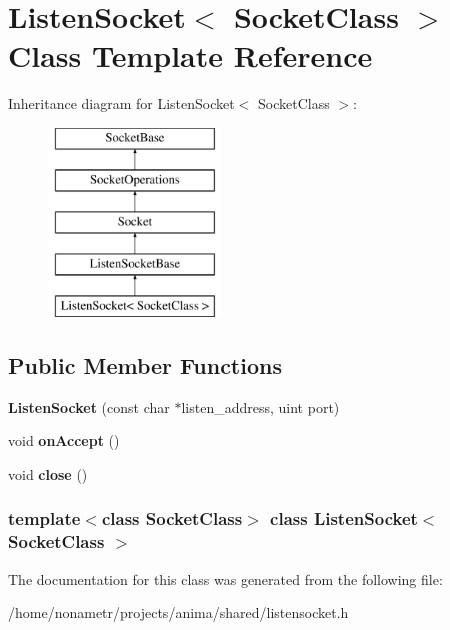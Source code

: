 \hypertarget{classListenSocket}{
\section{ListenSocket$<$ SocketClass $>$ Class Template Reference}
\label{classListenSocket}
}
Inheritance diagram for ListenSocket$<$ SocketClass $>$:\begin{figure}[H]
\begin{center}
\leavevmode
\includegraphics[height=5.000000cm]{classListenSocket}
\end{center}
\end{figure}
\subsection*{Public Member Functions}
\begin{DoxyCompactItemize}
\item 
\hypertarget{classListenSocket_a88bc05466de1c71e9981b1664a0631dd}{
{\bfseries ListenSocket} (const char $\ast$listen\_\-address, uint port)}
\label{classListenSocket_a88bc05466de1c71e9981b1664a0631dd}

\item 
\hypertarget{classListenSocket_ac62a573cd01cf0826e8d2a3872565e58}{
void {\bfseries onAccept} ()}
\label{classListenSocket_ac62a573cd01cf0826e8d2a3872565e58}

\item 
\hypertarget{classListenSocket_a611c169149189c64d3aa582806692350}{
void {\bfseries close} ()}
\label{classListenSocket_a611c169149189c64d3aa582806692350}

\end{DoxyCompactItemize}
\subsubsection*{template$<$class SocketClass$>$ class ListenSocket$<$ SocketClass $>$}



The documentation for this class was generated from the following file:\begin{DoxyCompactItemize}
\item 
/home/nonametr/projects/anima/shared/listensocket.h\end{DoxyCompactItemize}
